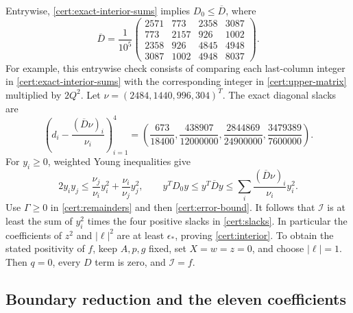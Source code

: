 Entrywise, \eqref{cert:exact-interior-sums} implies $D_0\le\overline D$, where
\begin{equation}\label{cert:upper-matrix}
 \overline D=\frac1{10^5}
 \begin{pmatrix}
 2571&773&2358&3087\\
 773&2157&926&1002\\
 2358&926&4845&4948\\
 3087&1002&4948&8037
 \end{pmatrix}.
\end{equation}
For example, this entrywise check consists of comparing each last-column
integer in \eqref{cert:exact-interior-sums} with the corresponding integer
in \eqref{cert:upper-matrix} multiplied by $2Q^2$.
Let $\nu=(2484,1440,996,304)^T$.  The exact diagonal slacks are
\begin{equation}\label{cert:slacks}
 \left(d_i-\frac{(\overline D\nu)_i}{\nu_i}\right)_{i=1}^4
 =\left(\frac{673}{18400},\frac{438907}{12000000},
         \frac{2844869}{24900000},\frac{3479389}{7600000}\right).
\end{equation}
For $y_i\ge0$, weighted Young inequalities give
\[
 2y_iy_j\le\frac{\nu_j}{\nu_i}y_i^2+
                  \frac{\nu_i}{\nu_j}y_j^2,
 \qquad
 y^TD_0y\le y^T\overline D y
       \le\sum_i\frac{(\overline D\nu)_i}{\nu_i}y_i^2.
\]
Use $\Gamma\ge0$ in \eqref{cert:remainders} and then
\eqref{cert:error-bound}.  It follows that $\mathcal I$ is at least the
sum of $y_i^2$ times the four positive slacks in \eqref{cert:slacks}.
In particular the coefficients of $z^2$ and $|\ell|^2$ are at least
$\epsilon_*$, proving \eqref{cert:interior}.  To obtain the stated positivity
of $f$, keep $A,p,g$ fixed, set $X=w=z=0$, and choose $|\ell|=1$.
Then $q=0$, every $D$ term is zero, and $\mathcal I=f$.

\subsection{Boundary reduction and the eleven coefficients}\label{cert:boundary-remainder}

